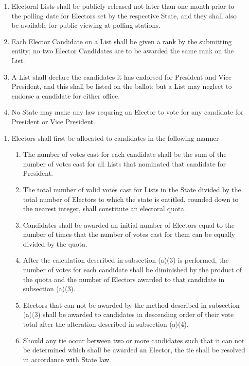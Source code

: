 \documentclass{article}
\begin{document}
\begin{enumerate}
        \item Electoral Lists shall be publicly released not later than one month prior to the polling date for Electors set by the respective State, and they shall also be available for public viewing at polling stations.
        \item Each Elector Candidate on a List shall be given a rank by the submitting entity; no two Elector Candidates are to be awarded the same rank on the List.
        \item A List shall declare the candidates it has endorsed for President and Vice President, and this shall be listed on the ballot; but a List may neglect to endorse a candidate for either office.
        \item No State may make any law requring an Elector to vote for any candidate for President or Vice President.
    \end{enumerate}
    \begin{enumerate}
        \item Electors shall first be allocated to candidates in the following manner---
        \begin{enumerate}
            \item The number of votes cast for each candidate shall be the sum of the number of votes cast for all Lists that nominated that candidate for President.
            \item The total number of valid votes cast for Lists in the State divided by the total number of Electors to which the state is entitled, rounded down to the nearest integer, shall constitute an electoral quota.
            \item Candidates shall be awarded an initial number of Electors equal to the number of times that the number of votes cast for them can be equally divided by the quota.
            \item After the calculation described in subsection (a)(3) is performed, the number of votes for each candidate shall be diminished by the product of the quota and the number of Electors awarded to that candidate in subsection (a)(3).
            \item Electors that can not be awarded by the method described in subsection (a)(3) shall be awarded to candidates in descending order of their vote total after the alteration described in subsection (a)(4).
            \item Should any tie occur between two or more candidates such that it can not be determined which shall be awarded an Elector, the tie shall be resolved in accordance with State law.
        \end{enumerate}
    \end{enumerate}
\end{document}
